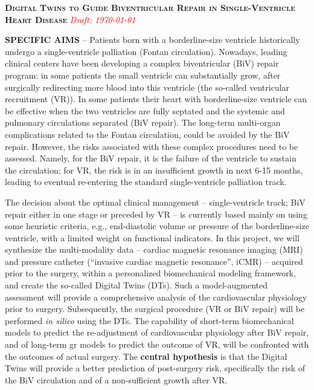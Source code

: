 



\centerline{\textbf{\textsc{Digital Twins to Guide Biventricular Repair in Single-Ventricle Heart Disease}} 
\textcolor{red}{\it \scriptsize Draft: \today}
}

\textbf{SPECIFIC AIMS} -- Patients born with a borderline-size ventricle historically undergo a single-ventricle palliation (Fontan circulation). 
Nowadays, leading clinical centers have been developing a complex biventricular (BiV) repair program: in some patients the small ventricle can substantially grow, after surgically redirecting more blood into this ventricle (the so-called ventricular recruitment (VR)). In some patients their heart with borderline-size ventricle can be effective when  the two ventricles are fully septated  and the systemic and pulmonary circulations separated (BiV repair). 
The long-term multi-organ complications related to the Fontan circulation, could be avoided by the BiV repair. However, the risks associated with these complex procedures need to be assessed. Namely, for the BiV repair, it is the failure of the ventricle to sustain the circulation; %
for VR, the risk is in an insufficient growth in next 6-15 months, leading to eventual re-entering the standard single-ventricle palliation track.

The decision about the optimal clinical management -- single-ventricle track; BiV repair either in one stage or preceded by VR -- is currently based mainly on using some heuristic criteria, e.g., end-diastolic volume or pressure of the borderline-size ventricle, with a limited weight on functional indicators. 
In this project, we will synthesize the multi-modality data -- cardiac magnetic resonance imaging (MRI) and pressure catheter (“invasive cardiac magnetic resonance”, iCMR) -- acquired prior to the surgery, within a personalized biomechanical modeling framework, and create the so-called Digital Twins (DTs). Such a model-augmented assessment will provide a comprehensive analysis of the cardiovascular physiology prior to surgery. Subsequently, the surgical procedure (VR or BiV repair) will be performed {\it in silico} using the DTs. The capability of short-term biomechanical models to predict the re-adjustment of cardiovascular physiology after BiV repair, and of long-term \gls*{gr} models to predict the outcome of VR, will be confronted with the outcomes of actual surgery. The \textbf{central hypothesis} is that the Digital Twins will provide a better prediction of post-surgery risk, specifically the risk of the BiV circulation and of a non-sufficient growth after VR. 


